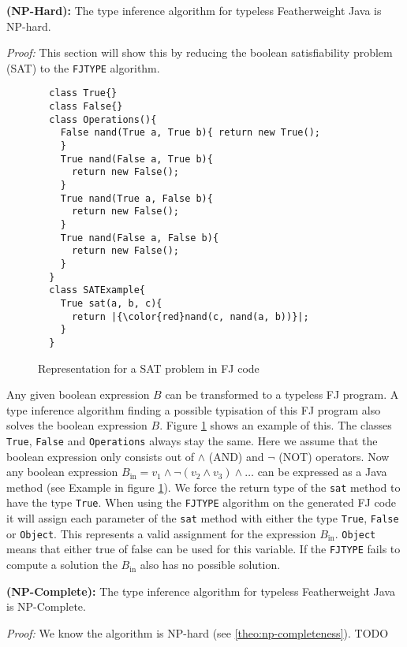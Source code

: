 
\begin{theoremAndi}
  \label{theo:np-hardness}
  \textbf{(NP-Hard):}
  The type inference algorithm for typeless Featherweight Java is NP-hard.
\end{theoremAndi}

\textit{Proof:} This section will show this by reducing the boolean satisfiability problem (SAT) to the \texttt{FJTYPE} algorithm.

\begin{figure}
\begin{lstlisting}
  class True{}
  class False{}
  class Operations(){
    False nand(True a, True b){ return new True();
    }
    True nand(False a, True b){
      return new False();
    }
    True nand(True a, False b){
      return new False();
    }
    True nand(False a, False b){
      return new False();
    }
  }
  class SATExample{
    True sat(a, b, c){
      return |{\color{red}nand(c, nand(a, b))}|;
    }
  }
\end{lstlisting}

\caption{Representation for a SAT problem in FJ code}
\label{fig:fjSATcode}
\end{figure}

Any given boolean expression $B$ can be transformed to a typeless FJ program.
A type inference algorithm finding a possible typisation of this FJ program also solves the boolean expression $B$.
Figure \ref{fig:fjSATcode} shows an example of this.
The classes \texttt{True}, \texttt{False} and \texttt{Operations} always stay the same.
Here we assume that the boolean expression only consists out of $\land$ (AND) and $\neg$ (NOT) operators.
Now any boolean expression $B_\text{in} = v_1 \land \neg (v_2 \land v_3) \land \ldots$ can be expressed as a Java method
(see  Example in figure \ref{fig:fjSATcode}).
We force the return type of the \texttt{sat} method to have the type \texttt{True}.
When using the \texttt{FJTYPE} algorithm on the generated FJ code it will
assign each parameter of the \texttt{sat} method with either the type \texttt{True}, \texttt{False}
or \texttt{Object}.
This represents a valid assignment for the expression $B_\text{in}$.
\texttt{Object} means that either true of false can be used for this variable.
If the \texttt{FJTYPE} fails to compute a solution the $B_\text{in}$ also has no possible solution.


\begin{theoremAndi}
  \label{theo:np-completeness}
  \textbf{(NP-Complete):}
  The type inference algorithm for typeless Featherweight Java is NP-Complete.
\end{theoremAndi}

\textit{Proof:} We know the algorithm is NP-hard (see \ref{theo:np-completeness}).
TODO
